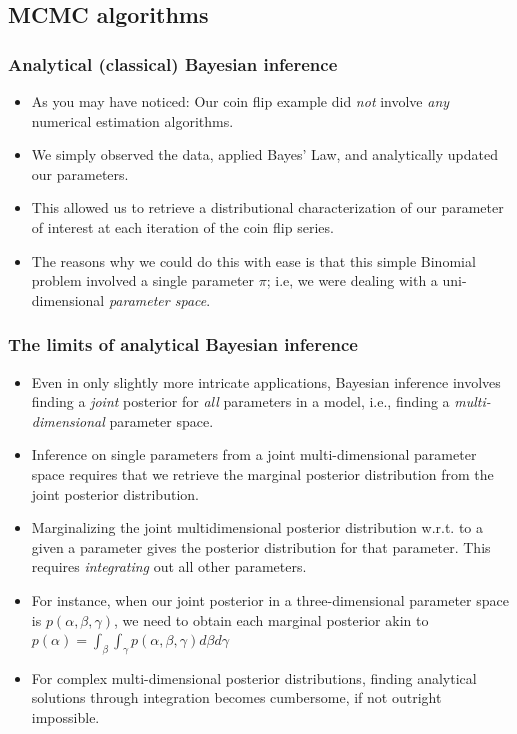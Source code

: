 \documentclass[
  11pt,
]{article}
\providecommand{\tightlist}{%
  \setlength{\itemsep}{0pt}\setlength{\parskip}{0pt}}
\begin{document}
\hypertarget{mcmc-algorithms}{%
\subsection{MCMC algorithms}\label{mcmc-algorithms}}

\hypertarget{analytical-classical-bayesian-inference}{%
\subsubsection{Analytical (classical) Bayesian inference}\label{analytical-classical-bayesian-inference}}

\begin{itemize}
\tightlist
\item
  As you may have noticed: Our coin flip example did \emph{not} involve
  \emph{any} numerical estimation algorithms.
\item
  We simply observed the data, applied Bayes' Law, and analytically
  updated our parameters.
\item
  This allowed us to retrieve a distributional characterization of our
  parameter of interest at each iteration of the coin flip series.
\item
  The reasons why we could do this with ease is that this simple
  Binomial problem involved a single parameter \(\pi\); i.e, we were
  dealing with a uni-dimensional \emph{parameter space}.
\end{itemize}

\hypertarget{the-limits-of-analytical-bayesian-inference}{%
\subsubsection{The limits of analytical Bayesian inference}\label{the-limits-of-analytical-bayesian-inference}}

\begin{itemize}
\tightlist
\item
  Even in only slightly more intricate applications, Bayesian
  inference involves finding a \emph{joint} posterior for \emph{all} parameters
  in a model, i.e., finding a \emph{multi-dimensional} parameter space.
\item
  Inference on single parameters from a joint multi-dimensional
  parameter space requires that we retrieve the marginal posterior
  distribution from the joint posterior distribution.
\item
  Marginalizing the joint multidimensional posterior distribution
  w.r.t. to a given a parameter gives the posterior distribution for
  that parameter. This requires \emph{integrating} out all other
  parameters.
\item
  For instance, when our joint posterior in a three-dimensional
  parameter space is \(p(\alpha,\beta, \gamma)\), we need to obtain each
  marginal posterior akin to
  \(p(\alpha) = \int_{\beta} \int_{\gamma} p(\alpha,\beta, \gamma) d\beta d\gamma\)
\item
  For complex multi-dimensional posterior distributions, finding
  analytical solutions through integration becomes cumbersome, if not
  outright impossible.
\end{itemize}
\end{document}
